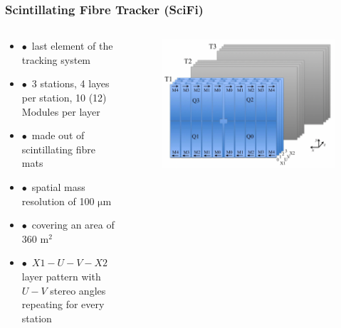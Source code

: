 \documentclass[aspectratio=1610, 12pt, xcolor=dvipsnames]{beamer}
\begin{document}
\begin{frame}\frametitle{Scintillating Fibre Tracker (SciFi)}
  \begin{columns}
    \begin{column}[c]{0.48\textwidth} 
      \begin{itemize}
        \item $\bullet$\, last element of the tracking system
        \item $\bullet$\, 3 stations, 4 layes per station, 10 (12) Modules per layer
        \item $\bullet$\, made out of scintillating fibre mats
        \item $\bullet$\, spatial mass resolution of 100 $\si{\micro\metre}$
        \item $\bullet$\, covering an area of 360 $\si{\metre\squared}$
        \item $\bullet$\, $X1-U-V-X2$ layer pattern with $U-V$ stereo angles repeating for every station
      \end{itemize}
    \end{column}
    \begin{column}[c]{0.48\textwidth}
      \begin{figure}
        \centering
        \includegraphics[width=\textwidth]{plots/scifi_layers.png}
      \end{figure}
    \end{column}
  \end{columns}
\end{frame}
\end{document}
